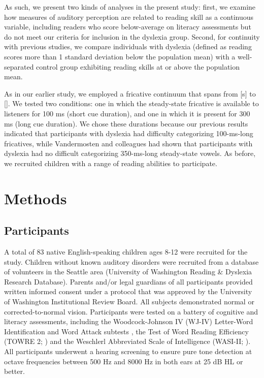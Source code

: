 \documentclass[../uwthesis.tex]{subfiles}
\begin{document}
As such, we present two kinds of analyses in the present study: first, we examine how measures of auditory perception are related to reading skill as a continuous variable, including readers who score below-average on literacy assessments but do not meet our criteria for inclusion in the dyslexia group. Second, for continuity with previous studies, we compare individuals with dyslexia (defined as reading scores more than 1 standard deviation below the population mean) with a well-separated control group exhibiting reading skills at or above the population mean.

As in our earlier study, we employed a fricative continuum that spans from [s] to []. We tested two conditions: one in which the steady-state fricative is available to listeners for 100 ms (short cue duration), and one in which it is present for 300 ms (long cue duration). We chose these durations because our previous results indicated that participants with dyslexia had difficulty categorizing 100-ms-long fricatives, while Vandermosten and colleagues had shown that participants with dyslexia had no difficult categorizing 350-ms-long steady-state vowels. As before, we recruited children with a range of reading abilities to participate.

\section{Methods}
\subsection{Participants}
A total of 83 native English-speaking children ages 8-12 were recruited for the study. Children without known auditory disorders were recruited from a database of volunteers in the Seattle area (University of Washington Reading \& Dyslexia Research Database). Parents and/or legal guardians of all participants provided written informed consent under a protocol that was approved by the University of Washington Institutional Review Board. All subjects demonstrated normal or corrected-to-normal vision. Participants were tested on a battery of cognitive and literacy assessments, including the Woodcock-Johnson IV (WJ-IV) Letter-Word Identification and Word Attack subtests \cite{Schrank2014Woodcock-JohnsonAchievement}, the Test of Word Reading Efficiency (TOWRE 2; \cite{Torgesen2011TOWREEfficiency}) and the Weschlerl Abbreviated Scale of Intelligence (WASI-II; \cite{Wechsler2011WechslerManual.}). All participants underwent a hearing screening to ensure pure tone detection at octave frequencies between 500 Hz and 8000 Hz in both ears at 25 dB HL or better.
\end{document}
